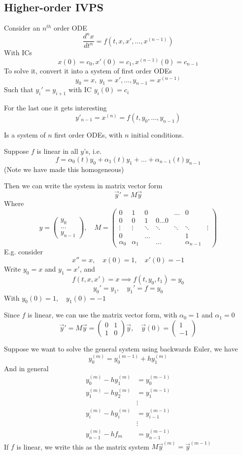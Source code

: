 \documentclass{X:/Documents/Coding/Latex/myassignment}
\begin{document}
\subsection{Higher-order IVPS}
Consider an $n^{th}$ order ODE
\[\frac{d^nx}{dt^n} = f(t,x,x',\ldots,x^{(n-1)})\]
With ICs 
\[x(0) = c_0, x'(0) = c_1, x^{(n-1)}(0) = c_{n-1}\]
To solve it, convert it into a system of first order ODEs
\[y_0 = x, \ y_1 = x', \ldots, y_{n-1} = x^{(n-1)}\]
Such that $y_i' = y_{i+1}$ with IC $y_i(0) = c_i$

For the last one it gets interesting
\[y'_{n-1} = x^{(n)} = f(t,y_0,\ldots,y_{n-1})\]

Is a system of $n$ first order ODEs, with $n$ initial conditions.

Suppose $f$ is linear in all $y$'s, i.e.
\[f = \alpha_0(t) y_0 + \alpha_1(t)y_1 + \ldots + \alpha_{n-1}(t) y_{n-1}\]
(Note we have made this homogeneous)

Then we can write the system in matrix vector form
\[\vec y' = M\vec y\]
Where 
\[y = \begin{pmatrix}
    y_0\\\ldots\\y_{n-1}
\end{pmatrix}, \quad M = \begin{pmatrix}
    0&1&0&&\ldots&0\\0&0&1&0\ldots0\\\vdots&\vdots&\ddots&\ddots&\ddots&\ddots&\vdots\\0 &&\ldots&&&1\\ \alpha_0 &\alpha_1 & & \ldots && \alpha_{n-1}
\end{pmatrix}\]
E.g. consider
\[x'' = x, \quad x(0) = 1, \quad x'(0) = -1\]
Write $y_0 = x$ and $y_1 = x'$, and
\[f(t,x,x') = x \implies f(t,y_0,t_1) = y_0\]
\[y_0' = y_1 ,\quad y_1' = f = y_0\]
With $y_0(0) = 1, \quad y_1(0) = -1$

Since $f$ is linear, we can use the matrix vector form, with $\alpha_0 = 1$ and $\alpha_1 = 0$
\[\vec y' = M\vec y = \begin{pmatrix}
    0&1\\1&0
\end{pmatrix} \vec y, \quad \vec y(0) = \begin{pmatrix}
    1\\-1
\end{pmatrix}\]

Suppose we want to solve the general system using backwards Euler,
we have
\[y_0^{(m)} = y_0^{(m-1)} + h y_1^{(m)}\]
And in general
\begin{align*}
    y_0^{(m)} - h y_1^{(m)} &= y_0^{(m-1)}\\
    y_1^{(m)} - h y_2^{(m)} &= y_1^{(m-1)}\\
    &\vdots\\
    y_i^{(m)} - h y_i^{(m)} &= y_{i-1}^{(m-1)}\\
    &\vdots\\
    y_{n-1}^{(m)}- h f_m &= y_{n-1}^{(m-1)}
\end{align*}
If $f$ is linear, we write this as the matrix system $M\vec y^{(m)} = \vec y^{(m-1)}$
\end{document}
